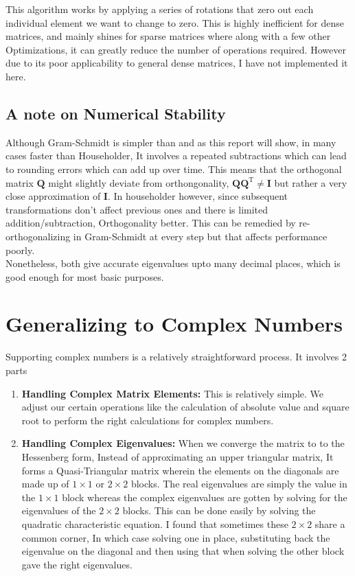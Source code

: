 \documentclass[12pt,a4paper]{article}
\let\vec\mathbf
\begin{document}
This algorithm works by applying a series of rotations that zero out each individual element we want to change to zero. This is highly inefficient for dense matrices, and mainly shines for sparse matrices where along with a few other Optimizations, it can greatly reduce the number of operations required. However due to its poor applicability to general dense matrices, I have not implemented it here.

\subsection{A note on Numerical Stability}

Although Gram-Schmidt is simpler than and as this report will show, in many cases faster than Householder, It involves a repeated subtractions which can lead to rounding errors which can add up over time. This means that the orthogonal matrix $\vec{Q}$ might slightly deviate from orthongonality, $\vec{QQ}^\text{T}\ne\vec{I}$ but rather a very close approximation of $\vec{I}$. In householder however, since subsequent transformations don't affect previous ones and there is limited addition/subtraction, Orthogonality better. This can be remedied by re-orthogonalizing in Gram-Schmidt at every step but that affects performance poorly.
\\

Nonetheless, both give accurate eigenvalues upto many decimal places, which is good enough for most basic purposes.

\section{Generalizing to Complex Numbers}

Supporting complex numbers is a relatively straightforward process. It involves 2 parts

\begin{enumerate}
    \item \textbf{Handling Complex Matrix Elements:} This is relatively simple. We adjust our certain operations like the calculation of absolute value and square root to perform the right calculations for complex numbers.
    
    \item \textbf{Handling Complex Eigenvalues:} When we converge the matrix to to the Hessenberg form, Instead of approximating an upper triangular matrix, It forms a Quasi-Triangular matrix wherein the elements on the diagonals are made up of $1 \times 1$ or $2 \times 2$ blocks. The real eigenvalues are simply the value in the $1 \times 1$ block whereas the complex eigenvalues are gotten by solving for the eigenvalues of the $2 \times 2$ blocks. This can be done easily by solving the quadratic characteristic equation. I found that sometimes these $2 \times 2$ share a common corner, In which case solving one in place, substituting back the eigenvalue on the diagonal and then using that when solving the other block gave the right eigenvalues.
\end{enumerate}
\end{document}
